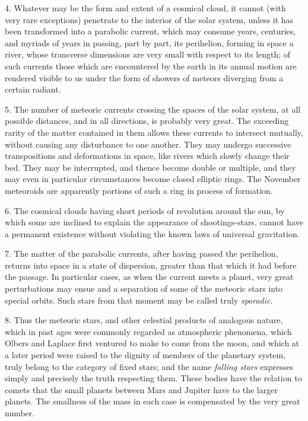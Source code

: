 \documentclass[a4paper, 12pt, oneside, polutonikogreek, english]{article}
\begin{document}
4. Whatever may be the form and extent of a cosmical cloud, it cannot (with very rare exceptions) penetrate to the interior of the solar system, unless it has been transformed into a parabolic current, which may consume years, centuries, and myriads of years in passing, part by part, its perihelion, forming in space a river, whose transverse dimensions are very small with respect to its length; of such currents those which are encountered by the earth in its annual motion are rendered visible to us under the form of showers of meteors diverging from a certain radiant.

5. The number of meteoric currents crossing the spaces of the solar system, at all possible distances, and in all directions, is probably very great. The exceeding rarity of the matter contained in them allows these currents to intersect mutually, without causing any disturbance to one another. They may undergo successive transpositions and deformations in space, like rivers which slowly change their bed. They may be interrupted, and thence become double or multiple, and they may even in particular circumstances become closed elliptic rings. The November meteoroids are apparently portions of such a ring in process of formation.

6. The cosmical clouds having short periods of revolution around the sun, by which some are inclined to explain the appearance of shootings-stars, cannot have a permanent existence without violating the known laws of universal gravitation.

7. The matter of the parabolic currents, after having passed the perihelion, returns into space in a state of dispersion, greater than that which it had before the passage. In particular cases, as when the current meets a planet, very great perturbations may ensue and a separation of some of the meteoric stars into special orbits. Such stars from that moment may be called truly \emph{sporadic}.

8. Thus the meteoric stars, and other celestial products of analogous nature, which in past ages were commonly regarded as atmospheric phenomena, which Olbers and Laplace first ventured to make to come from the moon, and which at a later period were raised to the dignity of members of the planetary system, truly belong to the category of fixed stars; and the name \emph{falling stars} expresses simply and precisely the truth respecting them. These bodies have the relation to comets that the small planets between Mars and Jupiter have to the larger planets. The smallness of the mass in each case is compensated by the very great number.
\end{document}
